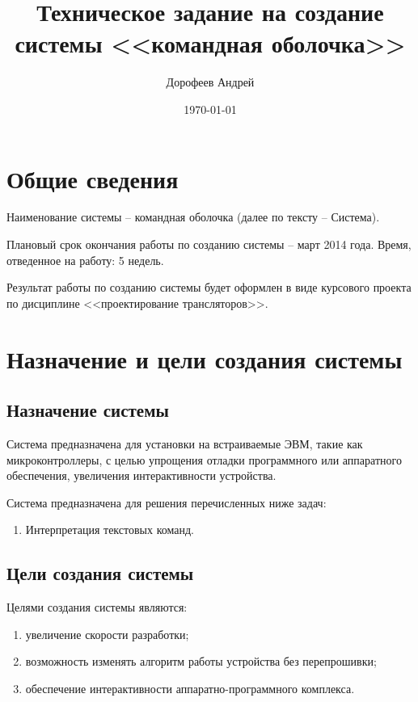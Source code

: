 \documentclass[a4paper, 12pt]{report}
\begin{document}
\author{Дорофеев Андрей}
\title{Техническое задание на создание системы <<командная оболочка>>} %
\date{\today}
\maketitle

\tableofcontents

\section{Общие сведения}
Наименование системы -- командная оболочка (далее по тексту -- 
Система).

Плановый срок окончания работы по созданию системы -- март 2014 года. 
Время, отведенное на работу: 5 недель.

Результат работы по созданию системы будет оформлен в виде курсового
проекта по дисциплине <<проектирование трансляторов>>.

\section{Назначение и цели создания системы}

\subsection{Назначение системы}

Система предназначена для установки на встраиваемые ЭВМ, такие как микроконтроллеры, с целью
упрощения отладки программного или аппаратного обеспечения, увеличения интерактивности устройства.

Система предназначена для решения перечисленных ниже задач:
\begin{enumerate}
	\item Интерпретация текстовых команд.
\end{enumerate}

\subsection{Цели создания системы}

Целями создания системы являются:
\begin{enumerate}
	\item увеличение скорости разработки;
	\item возможность изменять алгоритм работы устройства без перепрошивки;
	\item обеспечение интерактивности аппаратно-программного комплекса.
\end{enumerate}
\end{document}
